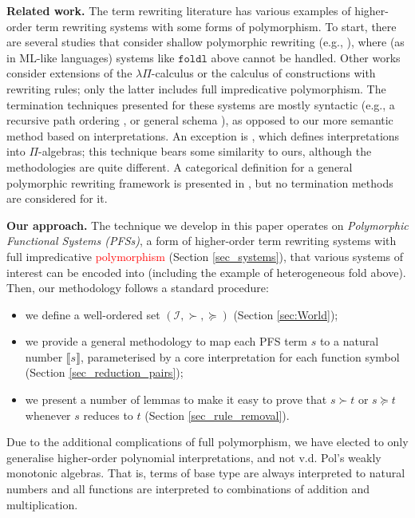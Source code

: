 \documentclass[a4paper,UKenglish,cleveref,autoref,numberwithinsect]{lipics-v2019}
\theoremstyle{definition}
\newcommand{\Iterms}{\mathcal{I}}
\newcommand{\interpret}[1]{\llbracket #1 \rrbracket}
\newcommand{\LCchange}[1]{\textcolor{red}{#1}}
\begin{document}
\medskip\noindent\textbf{Related work.} The term rewriting literature
has various examples of higher-order term rewriting systems with some
forms of polymorphism.  To start, there are several studies that
consider shallow polymorphic rewriting
(e.g., \cite{ham:18,jou:rub:07,wah:04}), where (as in ML-like
languages) systems like $\mathtt{foldl}$ above cannot be handled.
Other works consider extensions of the $\lambda\Pi$-calculus
\cite{cou:dow:07,dow:17} or the calculus of constructions
\cite{bla:05,wal:03} with rewriting rules; only the latter
includes full impredicative polymorphism.  The termination techniques
presented for these systems are mostly syntactic (e.g., a recursive
path ordering \cite{jou:rub:07,wal:03}, or general schema
\cite{bla:05}), as opposed to our more semantic method based on
interpretations.
An exception is \cite{dow:17}, which defines
interpretations into $\Pi$-algebras; this technique bears some
similarity to ours, although the methodologies are
quite different.  A categorical definition for a general polymorphic
rewriting framework is presented in \cite{fio:ham:13}, but no
termination methods are considered for it.

\medskip\noindent\textbf{Our approach.}
The technique we develop in this paper operates on \emph{Polymorphic
Functional Systems (PFSs)}, a form of higher-order term rewriting systems
with full impredicative \LCchange{polymorphism} (Section \ref{sec_systems}), that
various systems of interest can be encoded into (including the example
of heterogeneous fold above). Then, our methodology follows a standard
procedure:
\begin{itemize}
\item we define a well-ordered set $(\Iterms,\succ,\succeq)$
  (Section \ref{sec:World});
\item we provide a general methodology to map each PFS term $s$ to a
  natural number $\interpret{s}$, parameterised by a core interpretation
  for each function symbol (Section \ref{sec_reduction_pairs});
\item we present a number of lemmas to make it easy to prove that
  $s \succ t$ or $s \succeq t$ whenever $s$ reduces to $t$
  (Section \ref{sec_rule_removal}).
\end{itemize}
Due to the additional complications of full polymorphism, we have
elected to only generalise higher-order polynomial interpretations,
and not v.d. Pol's weakly monotonic algebras.  That is, terms of base
type are always interpreted to natural numbers and all functions are
interpreted to combinations of addition and multiplication.
\end{document}
